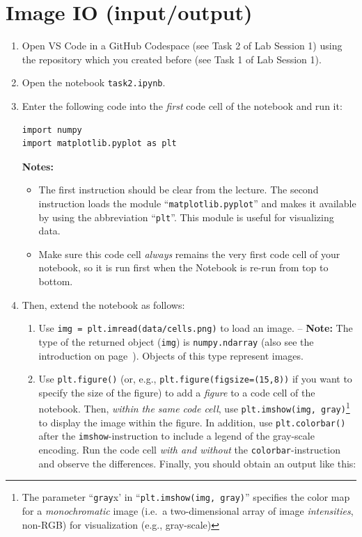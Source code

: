 \documentclass[12pt,a4paper]{article}
\begin{document}
\section{Image IO (input/output)}
\label{task:io}
\begin{enumerate}
    \item Open VS Code in a GitHub Codespace (see Task 2 of Lab Session 1) using the repository which you created before (see Task 1 of Lab Session 1).
    \item Open the notebook \texttt{task2.ipynb}.
    \item Enter the following code into the \emph{first} code cell of the notebook and run it:
\begin{Verbatim}[frame=single]
import numpy
import matplotlib.pyplot as plt
\end{Verbatim}
    \textbf{Notes:}
    \begin{itemize}
        \item The first instruction should be clear from the lecture. The second instruction loads the module ``\texttt{matplotlib.pyplot}'' and makes it available by using the abbreviation ``\texttt{plt}''. This module is useful for visualizing data.
        \item Make sure this code cell \emph{always} remains the very first code cell of your notebook, so it is run first when the Notebook is re-run from top to bottom.
    \end{itemize}
    \item Then, extend the notebook as follows:
    \begin{enumerate}
        \item Use \texttt{img = plt.imread(\textquotesingle{}data/cells.png\textquotesingle)} to load an image. -- \textbf{Note:} The type of the returned object (\texttt{img}) is \texttt{numpy.ndarray} (also see the introduction on page~\pageref{sec:ndarray}). Objects of this type represent images.
        \item Use \texttt{plt.figure()} (or, e.g., \texttt{plt.figure(figsize=(15,8))} if you want to specify the size of the figure) to add a \emph{figure} to a code cell of the notebook. Then, \emph{within the same code cell}, use \texttt{plt.imshow(img, \textquotesingle{}gray\textquotesingle)}\footnote{The parameter ``\texttt{\textquotesingle{}gray\textquotesingle}x' in ``\texttt{plt.imshow(img, \textquotesingle{}gray\textquotesingle)}'' specifies the color map for a \emph{monochromatic} image (i.e.\ a two-dimensional array of image \emph{intensities}, non-RGB) for visualization (e.g., gray-scale)} to display the image within the figure. In addition, use \texttt{plt.colorbar()} after the \texttt{imshow}-instruction to include a legend of the gray-scale encoding. Run the code cell \emph{with and without} the \texttt{colorbar}-instruction and observe the differences. Finally, you should obtain an output like this:

\end{enumerate}
\end{enumerate}
\end{document}
